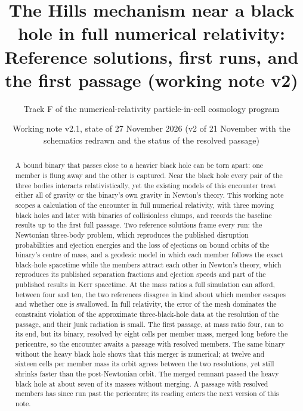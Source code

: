 \documentclass[aps,prd,twocolumn,10pt,superscriptaddress,nofootinbib,longbibliography,floatfix]{revtex4-2}
\begin{document}
\title{The Hills mechanism near a black hole in full numerical relativity:\\ Reference solutions, first runs, and the first passage (working note v2)}

\author{Track F of the numerical-relativity particle-in-cell cosmology program}

\date{Working note v2.1, state of 27 November 2026 (v2 of 21 November with the schematics redrawn and the status of the resolved passage)}

\begin{abstract}
A bound binary that passes close to a heavier black hole can be torn apart: one member is flung away and the other is captured. Near the black hole every pair of the three bodies interacts relativistically, yet the existing models of this encounter treat either all of gravity or the binary's own gravity in Newton's theory. This working note scopes a calculation of the encounter in full numerical relativity, with three moving black holes and later with binaries of collisionless clumps, and records the baseline results up to the first full passage. Two reference solutions frame every run: the Newtonian three-body problem, which reproduces the published disruption probabilities and ejection energies and the loss of ejections on bound orbits of the binary's centre of mass, and a geodesic model in which each member follows the exact black-hole spacetime while the members attract each other in Newton's theory, which reproduces its published separation fractions and ejection speeds and part of the published results in Kerr spacetime. At the mass ratios a full simulation can afford, between four and ten, the two references disagree in kind about which member escapes and whether one is swallowed. In full relativity, the error of the mesh dominates the constraint violation of the approximate three-black-hole data at the resolution of the passage, and their junk radiation is small. The first passage, at mass ratio four, ran to its end, but its binary, resolved by eight cells per member mass, merged long before the pericentre, so the encounter awaits a passage with resolved members. The same binary without the heavy black hole shows that this merger is numerical; at twelve and sixteen cells per member mass its orbit agrees between the two resolutions, yet still shrinks faster than the post-Newtonian orbit. The merged remnant passed the heavy black hole at about seven of its masses without merging. A passage with resolved members has since run past the pericentre; its reading enters the next version of this note.
\end{abstract}
\end{document}
